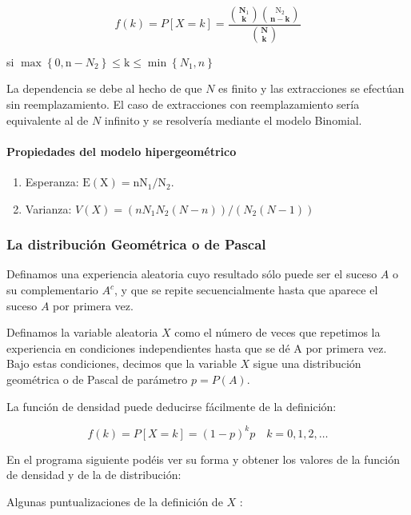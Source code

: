 \documentclass[
]{article}
\begin{document}
\[
f(k)=P[X=k]=\frac{\binom{\mathbf{N}_{1}}{\mathbf{k}}\binom{\mathrm{N}_{2}}{\mathbf{n}-\mathbf{k}}}{\binom{\mathbf{N}}{\mathbf{k}}}
\]

si \(\operatorname{max}\left\{0, \mathrm{n}-N_{2}\right\} \leq \mathrm{k} \leq \min \left\{N_{1}, n\right\}\)

La dependencia se debe al hecho de que \(N\) es finito y las extracciones se efectúan sin reemplazamiento. El caso de extracciones con reemplazamiento sería equivalente al de \(N\) infinito y se resolvería mediante el modelo Binomial.

\paragraph{Propiedades del modelo hipergeométrico}\label{propiedades-del-modelo-hipergeomuxe9trico}

\begin{enumerate}
\def\labelenumi{\arabic{enumi}.}
\item
  Esperanza: \(\mathrm{E}(\mathrm{X})=\mathrm{n} \mathrm{N}_{1} / \mathrm{N}_{2}\).
\item
  Varianza: \(V(X)=\left(n N_{1} N_{2}(N-n)\right) /\left(N_{2}(N-1)\right)\)
\end{enumerate}

\subsubsection{La distribución Geométrica o de Pascal}\label{la-distribuciuxf3n-geomuxe9trica-o-de-pascal}

Definamos una experiencia aleatoria cuyo resultado sólo puede ser el suceso \(A\) o su complementario \(A^{c}\), y que se repite secuencialmente hasta que aparece el suceso \(A\) por primera vez.

Definamos la variable aleatoria \(X\) como el número de veces que repetimos la experiencia en condiciones independientes hasta que se dé A por primera vez. Bajo estas condiciones, decimos que la variable \(X\) sigue una distribución geométrica o de Pascal de parámetro \(p=P(A)\).

La función de densidad puede deducirse fácilmente de la definición:

\[
f(k)=P[X=k]=(1-p)^{k} p \quad k=0,1,2, \ldots
\]

En el programa siguiente podéis ver su forma y obtener los valores de la función de densidad y de la de distribución:

Algunas puntualizaciones de la definición de \(X\) :
\end{document}
